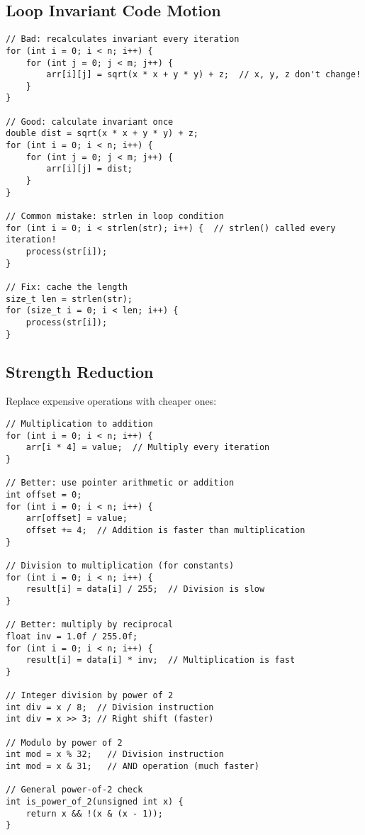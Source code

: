\subsection{Loop Invariant Code Motion}

\begin{lstlisting}
// Bad: recalculates invariant every iteration
for (int i = 0; i < n; i++) {
    for (int j = 0; j < m; j++) {
        arr[i][j] = sqrt(x * x + y * y) + z;  // x, y, z don't change!
    }
}

// Good: calculate invariant once
double dist = sqrt(x * x + y * y) + z;
for (int i = 0; i < n; i++) {
    for (int j = 0; j < m; j++) {
        arr[i][j] = dist;
    }
}

// Common mistake: strlen in loop condition
for (int i = 0; i < strlen(str); i++) {  // strlen() called every iteration!
    process(str[i]);
}

// Fix: cache the length
size_t len = strlen(str);
for (size_t i = 0; i < len; i++) {
    process(str[i]);
}
\end{lstlisting}

\subsection{Strength Reduction}

Replace expensive operations with cheaper ones:

\begin{lstlisting}
// Multiplication to addition
for (int i = 0; i < n; i++) {
    arr[i * 4] = value;  // Multiply every iteration
}

// Better: use pointer arithmetic or addition
int offset = 0;
for (int i = 0; i < n; i++) {
    arr[offset] = value;
    offset += 4;  // Addition is faster than multiplication
}

// Division to multiplication (for constants)
for (int i = 0; i < n; i++) {
    result[i] = data[i] / 255;  // Division is slow
}

// Better: multiply by reciprocal
float inv = 1.0f / 255.0f;
for (int i = 0; i < n; i++) {
    result[i] = data[i] * inv;  // Multiplication is fast
}

// Integer division by power of 2
int div = x / 8;  // Division instruction
int div = x >> 3; // Right shift (faster)

// Modulo by power of 2
int mod = x % 32;   // Division instruction
int mod = x & 31;   // AND operation (much faster)

// General power-of-2 check
int is_power_of_2(unsigned int x) {
    return x && !(x & (x - 1));
}
\end{lstlisting}


